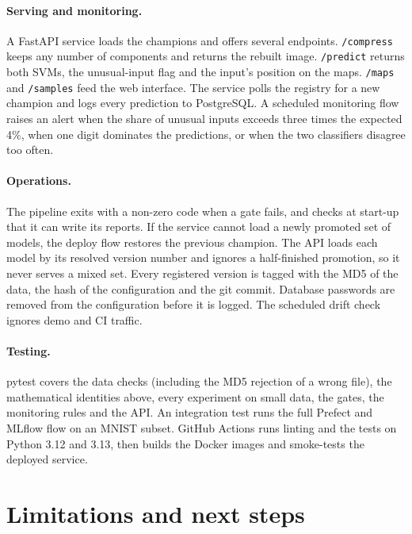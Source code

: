 \documentclass[11pt,a4paper]{article}
\begin{document}
\paragraph{Serving and monitoring.} A FastAPI service loads the champions and offers several endpoints. \texttt{/compress} keeps any number of components and returns the rebuilt image. \texttt{/predict} returns both SVMs, the unusual-input flag and the input's position on the maps. \texttt{/maps} and \texttt{/samples} feed the web interface. The service polls the registry for a new champion and logs every prediction to PostgreSQL. A scheduled monitoring flow raises an alert when the share of unusual inputs exceeds three times the expected 4\%, when one digit dominates the predictions, or when the two classifiers disagree too often.

\paragraph{Operations.} The pipeline exits with a non-zero code when a gate fails, and checks at start-up that it can write its reports. If the service cannot load a newly promoted set of models, the deploy flow restores the previous champion. The API loads each model by its resolved version number and ignores a half-finished promotion, so it never serves a mixed set. Every registered version is tagged with the MD5 of the data, the hash of the configuration and the git commit. Database passwords are removed from the configuration before it is logged. The scheduled drift check ignores demo and CI traffic.

\paragraph{Testing.} pytest covers the data checks (including the MD5 rejection of a wrong file), the mathematical identities above, every experiment on small data, the gates, the monitoring rules and the API. An integration test runs the full Prefect and MLflow flow on an MNIST subset. GitHub Actions runs linting and the tests on Python 3.12 and 3.13, then builds the Docker images and smoke-tests the deployed service.

\section{Limitations and next steps}
\end{document}
